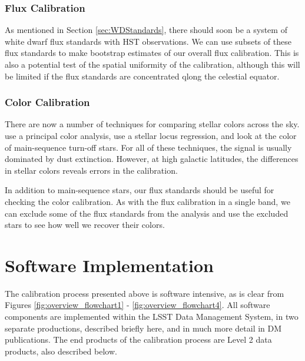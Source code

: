 \documentclass[12pt,preprint]{aastex}
\begin{document}
\subsubsection{Flux Calibration}

As mentioned in Section \ref{sec:WDStandards}, there should soon be a
system of white dwarf flux standards with HST observations.  We can
use subsets of these flux standards to make bootstrap estimates of our
overall flux calibration.  This is also a potential test of the
spatial uniformity of the calibration, although this will be limited
if the flux standards are concentrated qlong the celestial equator.  

\subsubsection{Color Calibration}

There are now a number of techniques for comparing stellar colors
across the sky.  \citet{Ivezic04} use a principal color analysis,
\citet{High09} use a stellar locus regression, and \citet{Schlafly10}
look at the color of main-sequence turn-off stars.  For all of these
techniques, the signal is usually dominated by dust extinction.
However, at high galactic latitudes, the differences in stellar colors
reveals errors in the calibration.

In addition to main-sequence stars, our flux standards should be
useful for checking the color calibration.  As with the flux
calibration in a single band, we can exclude some of the flux
standards from the analysis and use the excluded stars to see how
well we recover their colors.


\section{Software Implementation}
\label{sec:software}
The calibration process presented above is software intensive, as is clear from Figures \ref{fig:overview_flowchart1} -
\ref{fig:overview_flowchart4}.  All software components are implemented within the LSST Data Management System, in
two separate productions, described briefly here, and in much more detail in DM publications.
The end products of the calibration process are Level 2 data products, also described below.
\end{document}
